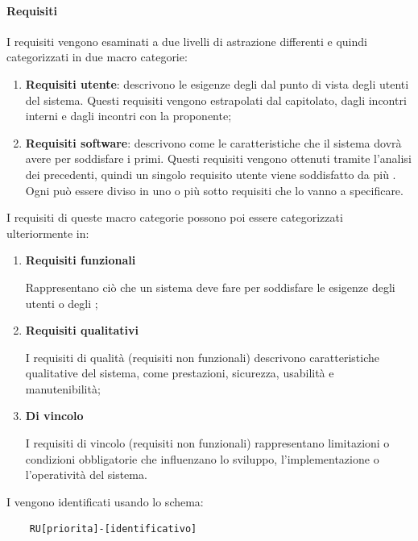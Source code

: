\paragraph{Requisiti}
I requisiti vengono esaminati a due livelli di astrazione differenti e quindi categorizzati in due macro categorie:
\begin{enumerate}
    \item \textbf{Requisiti utente}: descrivono le esigenze degli  dal punto di vista degli utenti del sistema.
    Questi requisiti vengono estrapolati dal capitolato, dagli incontri interni e dagli incontri con la proponente;

    \item \textbf{Requisiti software}: descrivono come le caratteristiche che il sistema dovrà avere per soddisfare i primi.
    Questi requisiti vengono ottenuti tramite l'analisi dei precedenti, quindi un singolo requisito utente viene soddisfatto da più .
    Ogni  può essere diviso in uno o più sotto requisiti che lo vanno a specificare.

\end{enumerate}
I requisiti di queste macro categorie possono poi essere categorizzati ulteriormente in:
\begin{enumerate}
    \item \textbf{Requisiti funzionali}
    
    Rappresentano ciò che un sistema deve fare per soddisfare le esigenze degli utenti o degli ;

    \item \textbf{Requisiti qualitativi}
    
    I requisiti di qualità (requisiti non funzionali) descrivono caratteristiche qualitative del sistema, come prestazioni, sicurezza, usabilità e manutenibilità;

    \item \textbf{Di vincolo}
    
    I requisiti di vincolo (requisiti non funzionali) rappresentano limitazioni o condizioni obbligatorie che influenzano lo sviluppo, l'implementazione o l'operatività del sistema. 

\end{enumerate}
I  vengono identificati usando lo schema:
\begin{lstlisting}
    RU[priorita]-[identificativo] 
\end{lstlisting}

